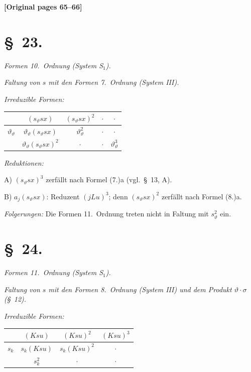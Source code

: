 \documentclass[12pt,a4paper]{article}
\begin{document}
\noindent\textbf{[Original pages 65--66]}

\section*{\S\ 23.}

\textit{Formen 10.\ Ordnung (System S$_1$).}

\textit{Faltung von $s$ mit den Formen 7.\ Ordnung (System III).}

\textit{Irreduzible Formen:}
\begin{center}
\begin{tabular}{c|cccc}
& $(s_\vartheta sx)$ & $(s_\vartheta sx)^2$ & $\cdot$ & $\cdot$ \\
\hline
$\vartheta_\vartheta$ & $\vartheta_\vartheta (s_\vartheta sx)$ & $\vartheta_\vartheta^2$ & $\cdot$ & $\cdot$ \\
& $\vartheta_\vartheta (s_\vartheta sx)^2$ & $\cdot$ & $\cdot$ & $\vartheta_\vartheta^3$
\end{tabular}
\end{center}

\textit{Reduktionen:}

A) $(s_\vartheta sx)^3$ zerfällt nach Formel (7.)a (vgl.\ \S\ 13, A).

B) $a_j(s_\vartheta sx)$: Reduzent $(jLu)^3$; denn $(s_\vartheta sx)^2$ zerfällt nach Formel (8.)a.

\textit{Folgerungen:} Die Formen 11.\ Ordnung treten nicht in Faltung mit $s_\vartheta^2$ ein.

\section*{\S\ 24.}

\textit{Formen 11.\ Ordnung (System S$_1$).}

\textit{Faltung von $s$ mit den Formen 8.\ Ordnung (System III) und dem Produkt $\vartheta \cdot \sigma$ (\S\ 12).}

\textit{Irreduzible Formen:}
\begin{center}
\begin{tabular}{c|ccc}
& $(Ksu)$ & $(Ksu)^2$ & $(Ksu)^3$ \\
\hline
$s_k$ & $s_k(Ksu)$ & $s_k(Ksu)^2$ & $\cdot$ \\
& $s_k^2$ & $\cdot$ & $\cdot$
\end{tabular}
\end{center}
\end{document}
